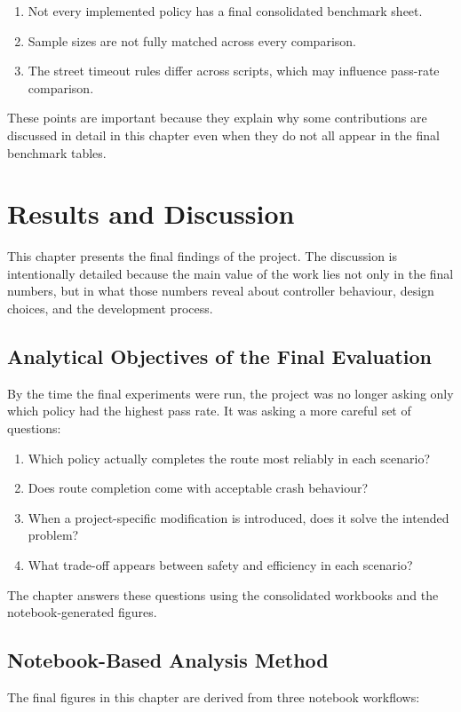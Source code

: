 \documentclass[12pt,a4paper]{report}
\begin{document}
\begin{enumerate}[label=\arabic*.]
    \item Not every implemented policy has a final consolidated benchmark sheet.
    \item Sample sizes are not fully matched across every comparison.
    \item The street timeout rules differ across scripts, which may influence pass-rate comparison.
\end{enumerate}

These points are important because they explain why some contributions are discussed in detail in this chapter even when they do not all appear in the final benchmark tables.

\chapter{Results and Discussion}

This chapter presents the final findings of the project. The discussion is intentionally detailed because the main value of the work lies not only in the final numbers, but in what those numbers reveal about controller behaviour, design choices, and the development process.

\section{Analytical Objectives of the Final Evaluation}
By the time the final experiments were run, the project was no longer asking only which policy had the highest pass rate. It was asking a more careful set of questions:

\begin{enumerate}[label=\arabic*.]
    \item Which policy actually completes the route most reliably in each scenario?
    \item Does route completion come with acceptable crash behaviour?
    \item When a project-specific modification is introduced, does it solve the intended problem?
    \item What trade-off appears between safety and efficiency in each scenario?
\end{enumerate}

The chapter answers these questions using the consolidated workbooks and the notebook-generated figures.

\section{Notebook-Based Analysis Method}
The final figures in this chapter are derived from three notebook workflows:
\end{document}
